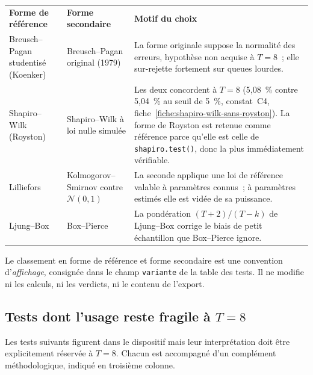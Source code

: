 \documentclass[a4paper,11pt]{article}
\newcommand{\code}[1]{\texttt{\small #1}}
\begin{document}
\begin{center}
\small
{}
\begin{tabular}{@{}p{3.6cm}p{3.6cm}p{7.6cm}@{}}
\rowcolor{tableheader}
\textcolor{financeblue}{\textbf{Forme de référence}} &
\textcolor{financeblue}{\textbf{Forme secondaire}} &
\textcolor{financeblue}{\textbf{Motif du choix}} \\
Breusch--Pagan studentisé (Koenker) & Breusch--Pagan original (1979) &
La forme originale suppose la normalité des erreurs, hypothèse non acquise
à $T = 8$~; elle sur-rejette fortement sur queues lourdes. \\
Shapiro--Wilk (Royston) & Shapiro--Wilk à loi nulle simulée &
Les deux concordent à $T = 8$ (5,08~\% contre 5,04~\% au seuil de 5~\%, constat~C4, fiche~\ref{fiche:shapiro-wilk-sans-royston}). La forme de Royston est
retenue comme référence parce qu'elle est celle de \code{shapiro.test()}, donc
la plus immédiatement vérifiable. \\
Lilliefors & Kolmogorov--Smirnov contre $\mathcal{N}(0,1)$ &
La seconde applique une loi de référence valable à paramètres connus~; à
paramètres estimés elle est vidée de sa puissance. \\
Ljung--Box & Box--Pierce &
La pondération $(T+2)/(T-k)$ de Ljung--Box corrige le biais de petit
échantillon que Box--Pierce ignore. \\
\end{tabular}
\end{center}

\noindent
Le classement en forme de référence et forme secondaire est une convention
d'\emph{affichage}, consignée dans le champ \code{variante} de la table des
tests. Il ne modifie ni les calculs, ni les verdicts, ni le contenu de l'export.

\subsection{Tests dont l'usage reste fragile à $T = 8$}

Les tests suivants figurent dans le dispositif mais leur interprétation doit
être explicitement réservée à $T = 8$. Chacun est accompagné d'un complément
méthodologique, indiqué en troisième colonne.
\end{document}
